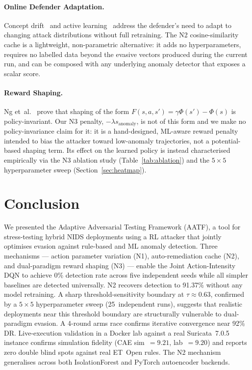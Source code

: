 \documentclass[sigconf]{acmart}
\begin{document}
\paragraph{Online Defender Adaptation.}
Concept drift~\cite{lu2018learning} and active
learning~\cite{settles2009active} address the defender's need to adapt
to changing attack distributions without full retraining. The N2
cosine-similarity cache is a lightweight, non-parametric alternative:
it adds no hyperparameters, requires no labelled data beyond the evasive
vectors produced during the current run, and can be composed with any
underlying anomaly detector that exposes a scalar score.

\paragraph{Reward Shaping.}
Ng et~al.~\cite{ng1999policy} prove that shaping of the form
$F(s,a,s') = \gamma\Phi(s') - \Phi(s)$ is policy-invariant. Our N3
penalty, $-\lambda s_{\mathrm{anomaly}}$, is not of this form and we make
no policy-invariance claim for it: it is a hand-designed, ML-aware
reward penalty intended to bias the attacker toward low-anomaly
trajectories, not a potential-based shaping term. Its effect on the
learned policy is instead characterised empirically via the N3 ablation
study (Table~\ref{tab:ablation}) and the $5\!\times\!5$ hyperparameter
sweep (Section~\ref{sec:heatmap}).

\section{Conclusion}
\label{sec:conclusion}

We presented the Adaptive Adversarial Testing Framework (AATF), a tool
for stress-testing hybrid NIDS deployments using a RL attacker that
jointly optimises evasion against rule-based and ML anomaly detection.
Three mechanisms --- action parameter variation (N1), auto-remediation
cache (N2), and dual-paradigm reward shaping (N3) --- enable the
Joint Action-Intensity DQN to achieve 0\% detection rate across five
independent seeds while all simpler baselines are detected universally.
N2 recovers detection to 91.37\% without any model retraining. A sharp
threshold-sensitivity boundary at $\tau \approx 0.63$, confirmed by a
$5\!\times\!5$ hyperparameter sweep
(25~independent runs), suggests that realistic deployments near this
threshold boundary are structurally vulnerable to dual-paradigm evasion.
A 4-round arms race confirms iterative convergence near 92\% DR.
Live-execution validation in a Docker lab against a real Suricata~7.0.5
instance confirms simulation fidelity (CAE sim~$= 9.21$, lab~$= 9.20$)
and reports zero double blind spots against real ET~Open rules. The N2
mechanism generalises across both IsolationForest and PyTorch autoencoder
backends.
\end{document}
